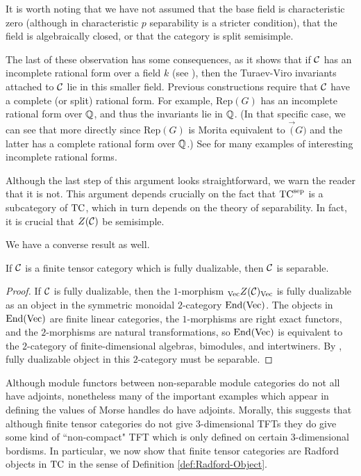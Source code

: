 \documentclass{amsart}
\begin{document}
\begin{remark}
It is worth noting that we have not assumed that the base field is characteristic zero (although in characteristic $p$ separability is a stricter condition), that the field is algebraically closed, or that the category is split semisimple.  

The last of these observation has some consequences, as it shows that if $\mathcal C$ has an incomplete rational form over a field $k$ (see \cite{1002.0168}), then the Turaev-Viro invariants attached to $\mathcal C$ lie in this smaller field.  Previous constructions require that $\mathcal C$ have a complete (or split) rational form.  For example, $\mathrm{Rep}(G)$ has an incomplete rational form over $\mathbb Q$, and thus the invariants lie in $\mathbb Q$.  (In that specific case, we can see that more directly since $\mathrm{Rep}(G)$ is Morita equivalent to $\Vec(G)$ and the latter has a complete rational form over $\mathbb Q$.)  See \cite{1102.0657} for many examples of interesting incomplete rational forms.
\end{remark}

\begin{warning}
Although the last step of this argument looks straightforward, we warn the reader that it is not.  This argument depends crucially on the fact that ${\mathrm{TC}^{\text{sep}}}$ is a subcategory of $\mathrm{TC}$, which in turn depends on the theory of separability.  In fact, it is crucial that $Z(\mathcal C)$ be semisimple.
\end{warning}

We have a converse result as well.

\begin{maintheorem}
If $\mathcal C$ is a finite tensor category which is fully dualizable, then $\mathcal C$ is separable.
\end{maintheorem}
\begin{proof}
If $\mathcal C$ is fully dualizable, then the $1$-morphism ${}_{\mathrm{Vec}} Z(\mathcal C)_{\mathrm{Vec}}$ is fully dualizable as an object in the symmetric monoidal $2$-category $\operatorname{End}(\mathrm{Vec})$.  The objects in $\operatorname{End}(\mathrm{Vec})$ are finite linear categories, the $1$-morphisms are right exact functors, and the $2$-morphisms are natural transformations, so $\operatorname{End}(\mathrm{Vec})$ is equivalent to the $2$-category of finite-dimensional algebras, bimodules, and intertwiners.  By \cite{???},  fully dualizable object in this $2$-category must be separable.
\end{proof}

Although module functors between non-separable module categories do not all have adjoints, nonetheless many of the important examples which appear in defining the values of Morse handles do have adjoints.  Morally, this suggests that although finite tensor categories do not give $3$-dimensional TFTs they do give some kind of ``non-compact" TFT which is only defined on certain $3$-dimensional bordisms.  In particular, we now show that finite tensor categories are Radford objects in $\mathrm{TC}$ in the sense of Definition \ref{def:Radford-Object}.
\end{document}
